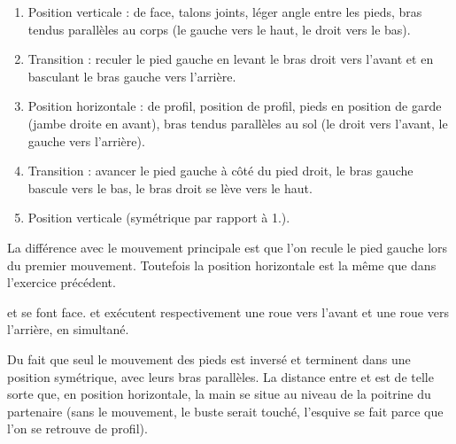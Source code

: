\begin{exercice}
	\label{struc:ex:roue-arrière}
	

	\begin{enumerate}
		\item Position verticale : de face, talons joints, léger angle entre les pieds, bras tendus parallèles au corps (le gauche vers le haut, le droit vers le bas).
		
		\item Transition : reculer le pied gauche en levant le bras droit vers l'avant et en basculant le bras gauche vers l'arrière.
		
		\item Position horizontale : de profil, position de profil, pieds en position de garde (jambe droite en avant), bras tendus parallèles au sol (le droit vers l'avant, le gauche vers l'arrière).
		
		\item Transition : avancer le pied gauche à côté du pied droit, le bras gauche bascule vers le bas, le bras droit se lève vers le haut.
		
		\item Position verticale (symétrique par rapport à 1.).
	\end{enumerate}

	La différence avec le mouvement principale est que l'on recule le pied gauche lors du premier mouvement.
	Toutefois la position horizontale est la même que dans l'exercice précédent.

\end{exercice}


\begin{exercice}
	\label{struc:ex:roue-deux}

	

	\A et \D se font face.
	\A et \D exécutent respectivement une roue vers l'avant et une roue vers l'arrière, en simultané.

	Du fait que seul le mouvement des pieds est inversé \A et \D terminent dans une position symétrique, avec leurs bras parallèles.
	La distance entre \A et \D est de telle sorte que, en position horizontale, la main se situe au niveau de la poitrine du partenaire (sans le mouvement, le buste serait touché, l'esquive se fait parce que l'on se retrouve de profil).

\end{exercice}


